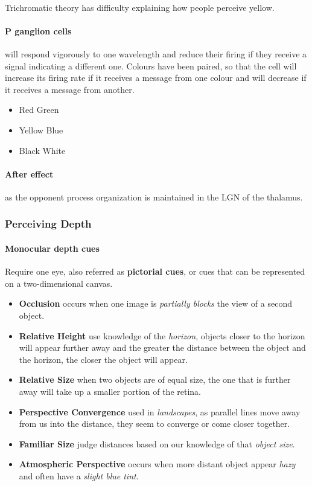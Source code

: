 \documentclass{article}
\begin{document}
	\paragraph{} Trichromatic theory has difficulty explaining how people perceive yellow.
	\paragraph{P ganglion cells} will respond vigorously to one wavelength and reduce their firing if they receive a signal indicating a different one. Colours have been paired, so that the cell will increase its firing rate if it receives a message from one colour and will decrease if it receives a message from another. 
	\begin{itemize}
		\item Red Green
		\item Yellow Blue
		\item Black White
	\end{itemize}
	\paragraph{After effect} as the opponent process organization is maintained in the LGN of the thalamus.
	\subsubsection{Perceiving Depth}
	\paragraph{Monocular depth cues} Require one eye, also referred as \textbf{pictorial cues}, or cues that can be represented on a two-dimensional canvas.
	\begin{itemize}
		\item \textbf{Occlusion} occurs when one image is \emph{partially blocks} the view of a second object.
		\item \textbf{Relative Height} use knowledge of the \emph{horizon}, objects closer to the horizon will appear further away and the greater the distance between the object and the horizon, the closer the object will appear.
		\item \textbf{Relative Size} when two objects are of equal size, the one that is further away will take up a smaller portion of the retina.
		\item \textbf{Perspective Convergence} used in \emph{landscapes}, as parallel lines move away from us into the distance, they seem to converge or come closer together.
		\item \textbf{Familiar Size} judge distances based on our knowledge of that \emph{object size}.
		\item \textbf{Atmospheric Perspective} occurs when more distant object appear \emph{hazy} and often have a \emph{slight blue tint}.
	\end{itemize}
\end{document}
